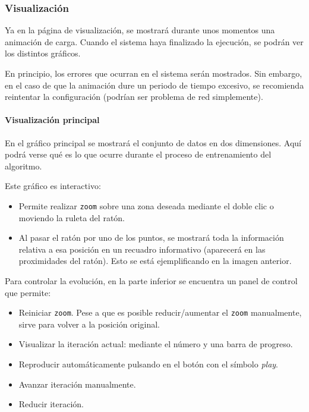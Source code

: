 \subsubsection{Visualización}
\label{mu:visualizacion}
Ya en la página de visualización, se mostrará durante unos momentos una
animación de carga. Cuando el sistema haya finalizado la ejecución, se podrán
ver los distintos gráficos.

En principio, los errores que ocurran en el sistema serán mostrados. Sin
embargo, en el caso de que la animación dure un periodo de tiempo excesivo, se
recomienda reintentar la configuración (podrían ser problema de red
simplemente).


\paragraph{Visualización principal} En el gráfico principal se mostrará el
conjunto de datos en dos dimensiones. Aquí podrá verse qué es lo que ocurre
durante el proceso de entrenamiento del algoritmo.


Este gráfico es interactivo:
\begin{itemize}
    \item Permite realizar \texttt{zoom} sobre una zona deseada mediante el
    doble clic o moviendo la ruleta del ratón.
    \item Al pasar el ratón por uno de los puntos, se mostrará toda la
    información relativa a esa posición en un recuadro informativo (aparecerá en
    las proximidades del ratón). Esto se está ejemplificando en la imagen
    anterior.
\end{itemize}

Para controlar la evolución, en la parte inferior se encuentra un panel de
control que permite:
\begin{itemize}
    \item Reiniciar \texttt{zoom}. Pese a que es posible reducir/aumentar el
    \texttt{zoom} manualmente, sirve para volver a la posición original.
    \item Visualizar la iteración actual: mediante el número y una barra de
    progreso.
    \item Reproducir automáticamente pulsando en el botón con el símbolo
    \textit{play}.
    \item Avanzar iteración manualmente.
    \item Reducir iteración.
\end{itemize}


